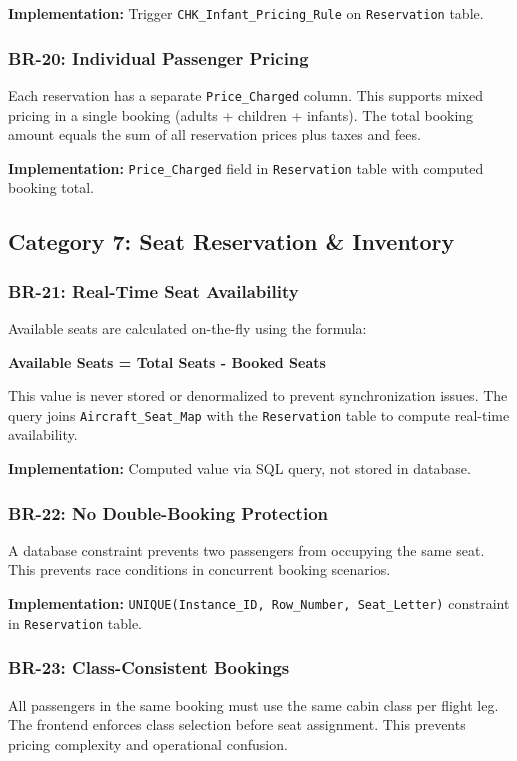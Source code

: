 \documentclass[12pt,a4paper,openany]{report}
\begin{document}
\textbf{Implementation:} Trigger \texttt{CHK\_Infant\_Pricing\_Rule} on \texttt{Reservation} table.

\subsubsection{BR-20: Individual Passenger Pricing}
Each reservation has a separate \texttt{Price\_Charged} column. This supports mixed pricing in a single booking (adults + children + infants). The total booking amount equals the sum of all reservation prices plus taxes and fees.

\textbf{Implementation:} \texttt{Price\_Charged} field in \texttt{Reservation} table with computed booking total.

\subsection{Category 7: Seat Reservation \& Inventory}

\subsubsection{BR-21: Real-Time Seat Availability}
Available seats are calculated on-the-fly using the formula:

\textbf{Available Seats = Total Seats - Booked Seats}

This value is never stored or denormalized to prevent synchronization issues. The query joins \texttt{Aircraft\_Seat\_Map} with the \texttt{Reservation} table to compute real-time availability.

\textbf{Implementation:} Computed value via SQL query, not stored in database.

\subsubsection{BR-22: No Double-Booking Protection}
A database constraint prevents two passengers from occupying the same seat. This prevents race conditions in concurrent booking scenarios.

\textbf{Implementation:} \texttt{UNIQUE(Instance\_ID, Row\_Number, Seat\_Letter)} constraint in \texttt{Reservation} table.

\subsubsection{BR-23: Class-Consistent Bookings}
All passengers in the same booking must use the same cabin class per flight leg. The frontend enforces class selection before seat assignment. This prevents pricing complexity and operational confusion.
\end{document}
